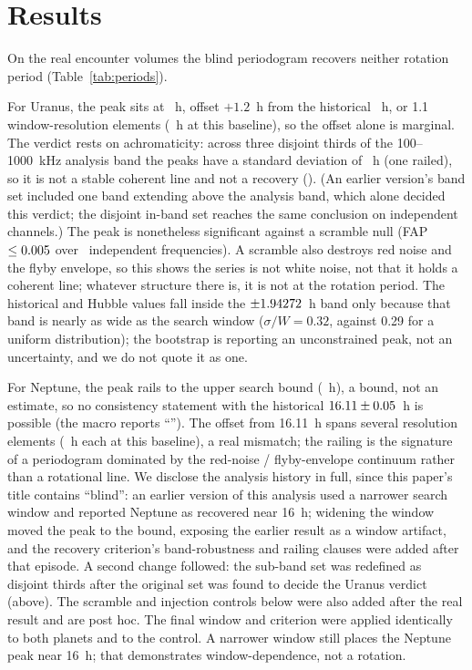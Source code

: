 \documentclass[twocolumn]{aastex631}
\begin{document}
\section{Results}
\label{sec:results}
On the real encounter volumes the blind periodogram recovers neither rotation period
(Table~\ref{tab:periods}).

For Uranus, the peak sits at \vgRealUPeriod~h, offset $+1.2$~h from the historical
\vgRealUHist~h, or 1.1 window-resolution elements (\vgRealURes~h at this baseline), so
the offset alone is marginal. The verdict rests on achromaticity: across three disjoint
thirds of the 100--1000~kHz analysis band the peaks have a standard deviation of \vgRealUSpread~h (one railed),
so it is not a stable coherent line and not a recovery (\vgRealURecovers). (An earlier
version's band set included one band extending above the analysis band, which alone decided
this verdict; the disjoint in-band set reaches the same conclusion on independent channels.)
The peak is nonetheless significant against a scramble null
(FAP $\le 0.005$ over \vgRealUNIndep\ independent frequencies). A scramble also
destroys red noise and the flyby envelope, so this shows the series is not white noise, not
that it holds a coherent line; whatever structure there is, it is not at the rotation period. The historical and Hubble values
fall inside the $\pm1.94272$~h band only because that band is nearly as wide as the
search window ($\sigma/W = 0.32$, against 0.29 for a uniform distribution); the bootstrap
is reporting an unconstrained peak, not an uncertainty, and we do not quote it as one.

For Neptune, the peak rails to the upper search bound (\vgRealNPeriod~h), a bound,
not an estimate, so no consistency statement with the historical $16.11 \pm 0.05$~h is
possible (the macro reports ``\vgRealNHistOK''). The offset from 16.11~h spans several resolution
elements (\vgRealNRes~h each at this baseline), a real mismatch; the railing is the signature of a periodogram dominated by the
red-noise / flyby-envelope continuum rather than a rotational line. We disclose the analysis
history in full, since this paper's title contains ``blind'': an earlier version of this
analysis used a narrower search window and reported Neptune as recovered near 16~h; widening
the window moved the peak to the bound, exposing the earlier result as a window artifact, and
the recovery criterion's band-robustness and railing clauses were added after that episode. A
second change followed: the sub-band set was redefined as disjoint thirds after the original set
was found to decide the Uranus verdict (above). The scramble and injection controls below were
also added after the real result and are post hoc. The final window and criterion were applied
identically to both planets and to the control. A narrower window still places the Neptune peak near 16~h; that
demonstrates window-dependence, not a rotation.
\end{document}
